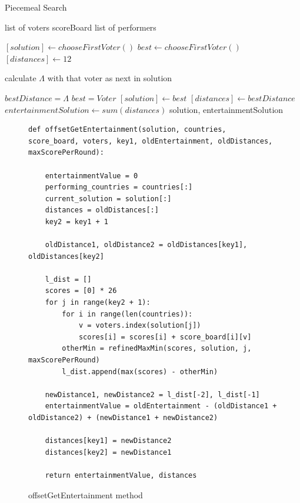 \documentclass[12pt]{report}
\begin{document}
\begin{algorithm}
\caption{Piecemeal Search}
\label{piecemealPseudocode}
\begin{algorithmic}[1]
\REQUIRE list of voters
\REQUIRE scoreBoard
\REQUIRE list of performers

\STATE $[solution] \leftarrow chooseFirstVoter()$
\STATE $best \leftarrow chooseFirstVoter()$
\STATE $[distances] \leftarrow 12$

\STATE calculate $\Lambda$ with that voter as next in solution

\STATE $bestDistance= \Lambda$
\STATE $best = Voter$
\ENDIF
\ENDFOR
\STATE $[solution] \leftarrow best$
\STATE $[distances] \leftarrow bestDistance$
\ENDFOR
\STATE $entertainmentSolution \leftarrow sum(distances)$
\RETURN solution, entertainmentSolution
\end{algorithmic}
\end{algorithm}

\begin{figure}[H]
\caption{offsetGetEntertainment method}
\label{offsetGetEntertainment}
\begin{lstlisting}
def offsetGetEntertainment(solution, countries, score_board, voters, key1, oldEntertainment, oldDistances, maxScorePerRound):
    
    entertainmentValue = 0
    performing_countries = countries[:]
    current_solution = solution[:]
    distances = oldDistances[:]
    key2 = key1 + 1

    oldDistance1, oldDistance2 = oldDistances[key1], oldDistances[key2]

    l_dist = []
    scores = [0] * 26
    for j in range(key2 + 1):
        for i in range(len(countries)):
            v = voters.index(solution[j])
            scores[i] = scores[i] + score_board[i][v]
        otherMin = refinedMaxMin(scores, solution, j, maxScorePerRound)
        l_dist.append(max(scores) - otherMin)
    
    newDistance1, newDistance2 = l_dist[-2], l_dist[-1]
    entertainmentValue = oldEntertainment - (oldDistance1 + oldDistance2) + (newDistance1 + newDistance2)
    
    distances[key1] = newDistance2
    distances[key2] = newDistance1
    
    return entertainmentValue, distances
\end{lstlisting}
\end{figure}
\end{document}
